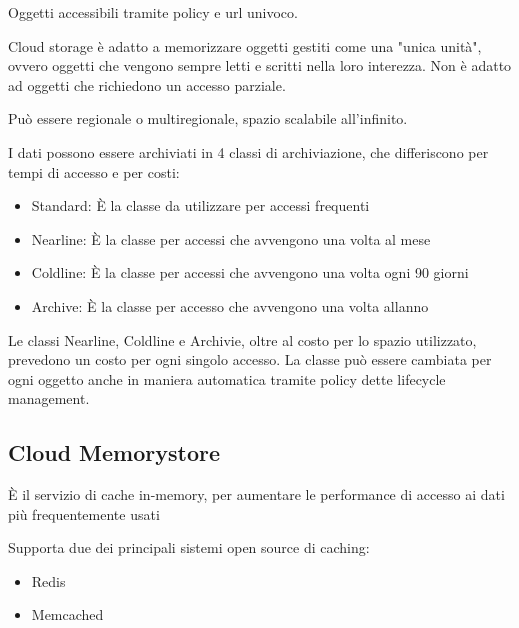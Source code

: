 \documentclass[
]{article}
\providecommand{\tightlist}{%
  \setlength{\itemsep}{0pt}\setlength{\parskip}{0pt}}
\begin{document}
{}

{Oggetti accessibili tramite policy e url univoco.}

{}

{Cloud storage è adatto a memorizzare oggetti gestiti come una "unica
unità", ovvero oggetti che vengono sempre letti e scritti nella loro
interezza. Non è adatto ad oggetti che richiedono un accesso parziale.}

{}

{Può essere regionale o multiregionale, spazio scalabile all'infinito.}

{I dati possono essere archiviati in 4 classi di archiviazione, che
differiscono per tempi di accesso e per costi: }

\begin{itemize}
\tightlist
\item
  {Standard: È la classe da utilizzare per accessi frequenti }
\item
  {Nearline: È la classe per accessi che avvengono una volta al mese }
\item
  {Coldline: È la classe per accessi che avvengono una volta ogni 90
  giorni }
\item
  {Archive: È la classe per accesso che avvengono una volta
  all\textquotesingle anno }
\end{itemize}

{}

{Le classi Nearline, Coldline e Archivie, oltre al costo per lo spazio
utilizzato, prevedono un costo per ogni singolo accesso. La classe può
essere cambiata per ogni oggetto anche in maniera automatica tramite
policy dette }{lifecycle management}{.}

{}

\subsection{\texorpdfstring{{Cloud
Memorystore}}{Cloud Memorystore}}\label{h.qdz31hamgsmw}

{È il servizio di cache in-memory, per aumentare le performance di
accesso ai dati più frequentemente usati }

{Supporta due dei principali sistemi open source di caching: }

\begin{itemize}
\tightlist
\item
  {Redis }
\item
  {Memcached }
\end{itemize}
\end{document}
